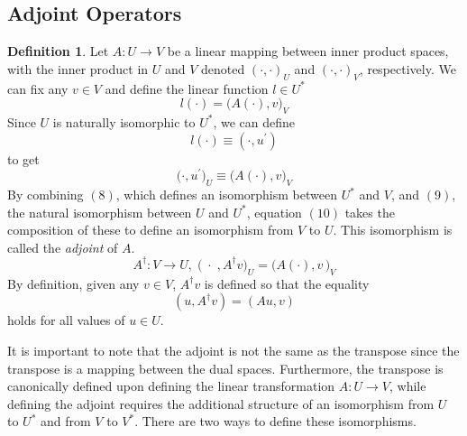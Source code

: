 \documentclass{article}
\theoremstyle{remark}
\theoremstyle{definition}
\newtheorem{definition}{Definition}[section]
\begin{document}
\subsection{Adjoint Operators}
\begin{definition}
Let $A: U \longrightarrow V$ be a linear mapping between inner product spaces, with the inner product in $U$ and $V$ denoted $(\cdot,\cdot)_U$ and $(\cdot,\cdot)_V$, respectively. We can fix any $v \in V$ and define the linear function $l \in U^*$
\begin{equation}
    l(\cdot) = \big(A(\cdot), v\big)_V
\end{equation}
Since $U$ is naturally isomorphic to $U^*$, we can define
\begin{equation}
    l(\cdot) \equiv (\cdot, u^\prime)
\end{equation} 
to get 
\begin{equation}
    \big(\cdot, u^\prime \big)_U \equiv \big(A(\cdot), v \big)_V
\end{equation}
By combining $(8)$, which defines an isomorphism between $U^*$ and $V$, and $(9)$, the natural isomorphism between $U$ and $U^*$, equation $(10)$ takes the composition of these to define an isomorphism from $V$ to $U$. This isomorphism is called the \textit{adjoint} of $A$. 
\[A^\dagger: V \longrightarrow U, \;  \big(\; \cdot \;, A^\dagger v \big)_U = \big( A(\cdot), v \,\big)_V \]
By definition, given any $v \in V$, $A^\dagger v$ is defined so that the equality
\[(u, A^\dagger v) = (A u, v)\]
holds for all values of $u \in U$. 
\end{definition}

It is important to note that the adjoint is not the same as the transpose since the transpose is a mapping between the dual spaces. Furthermore, the transpose is canonically defined upon defining the linear transformation $A: U \longrightarrow V$, while defining the adjoint requires the additional structure of an isomorphism from $U$ to $U^*$ and from $V$ to $V^*$. There are two ways to define these isomorphisms. 
\end{document}
